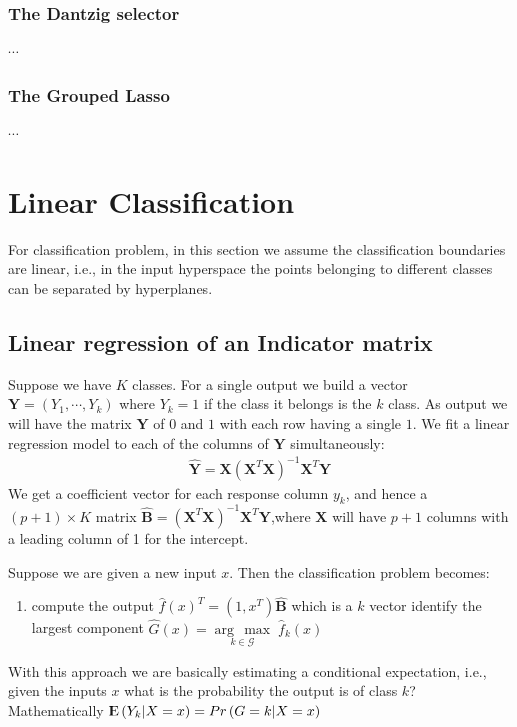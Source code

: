 \documentclass[12pt, letterpaper]{article}
\theoremstyle{definition}
\newcommand{\E}{{\rm I\kern-.3em E}}
\newcommand{\argmax}[1]{\underset{#1}{\operatorname{arg}\,\operatorname{max}}\;}
\begin{document}
\subsubsection{The Dantzig selector}
$\cdots$

\subsubsection{The Grouped Lasso}
$\cdots$

\section{Linear Classification}
For classification problem, in this section we assume the classification boundaries are linear, i.e., in the input hyperspace the points belonging to different classes can be separated by hyperplanes. 

\subsection{Linear regression of an Indicator matrix}
Suppose we have $K$ classes. For a single output we build a vector $\mathbf{Y} = \left( Y_1, \cdots, Y_k\right)$ where $Y_k=1$ if the class it belongs is the $k$ class. As output we will have the matrix $\mathbf{Y}$ of $0$ and $1$ with each row having a single $1$. We fit a linear regression model to each of the columns of $\mathbf{Y}$ simultaneously:
\begin{align*}
\hat{\mathbf{Y}} = \mathbf{X}\left( \mathbf{X}^T\mathbf{X}\right)^{-1}\mathbf{X}^T\mathbf{Y}
\end{align*}
We get a coefficient vector for each response column $y_k$, and hence a $(p+1) \times K$ matrix $\hat{\mathbf{B}} = \left( \mathbf{X}^T\mathbf{X}\right)^{-1}\mathbf{X}^T\mathbf{Y}$,where $\mathbf{X}$ will have $p+1$ columns with a leading column of 1 for the intercept.

Suppose we are given a new input $x$. Then the classification problem becomes:
\begin{enumerate}
\item compute the output $\hat{f}(x)^T = (1, x^T)\mathbf{\hat{B}}$ which is a $k$ vector
identify the largest component $\hat{G}(x) = \argmax{k \in \mathcal{G}} \hat{f}_k(x)$
\end{enumerate}

With this approach we are basically estimating a conditional expectation, i.e., given the inputs $x$ what is the probability the output is of class $k$? Mathematically $\E\left( Y_k|X=x\right) =  Pr\left( G=k|X=x\right)$ 
\end{document}
